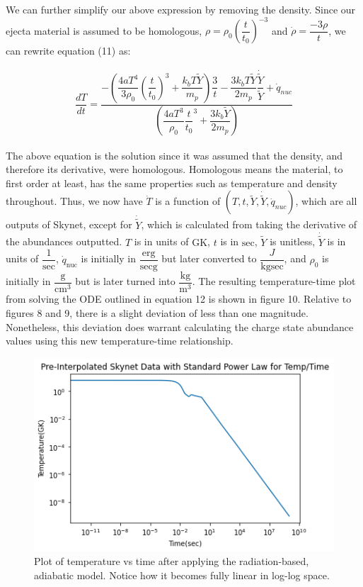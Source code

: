 \documentclass[11pt,a4paper]{article}
\begin{document}
We can further simplify our above expression by removing the density. Since our ejecta material is assumed to be homologous,  $\rho = \rho_0 \left(\dfrac{t}{t_0}\right)^{-3}$ and $\dot{\rho} = \dfrac{-3 \rho}{t}$, we can rewrite equation (11) as:

\begin{align}
	\dfrac{dT}{dt} =  \dfrac{ -\left( \dfrac{4aT^4}{3 \rho_0} \left (\dfrac{t}{t_0} \right)^3 + \dfrac{k_b T \tilde{Y}}{m_p} \right) \dfrac{3}{t} - \dfrac{3 k_b T \tilde{Y}}{2 m_p} \dfrac{\dot{\tilde{Y}}}{\tilde{Y}} + \dot{q}_{nuc} } {  \left( \dfrac{4 a T^3}{\rho_0} \dfrac{t}{t_0}^3 + \dfrac{3 k_b \tilde{Y}}{2 m_p}\right) }
\end{align}

The above equation is the solution since it was assumed that the density, and therefore its derivative, were homologous. Homologous means the material, to first order at least, has the same properties such as temperature and density throughout.  Thus, we now have $\dot{T}$ is a function of $(T,t,\tilde{Y}, \dot{\tilde{Y}},\dot{q}_{nuc})$, which are all outputs of Skynet, except for $\dot{\tilde{Y}}$, which is calculated from taking the derivative of the abundances outputted. $T$ is in units of $\mathrm{GK}$, $t$ is in $\mathrm{sec}$, $\tilde{Y}$ is unitless,                $\dot{\tilde{Y}}$ is in units of $\dfrac{1}{\mathrm{sec}}$, $\dot{q}_{\mathrm{nuc}}$ is initially in $\dfrac{\mathrm{erg}}{\mathrm{sec g}}$ but later converted to $\dfrac{J}{\mathrm{kg sec}}$, and $\rho_0$ is initially in $\dfrac{\mathrm{g}}{{\mathrm{cm}}^3}$ but is later turned into $\dfrac{\mathrm{kg}}{\mathrm{m}^3}$. The resulting temperature-time plot from solving the ODE outlined in equation 12 is shown in figure 10. Relative to figures 8 and 9, there is a slight deviation of less than one magnitude. Nonetheless, this deviation does warrant calculating the charge state abundance values using this new temperature-time relationship. \\


\begin{figure}[h!]
  \includegraphics[scale = .6]{linear_temp.png}
  \centering
  \caption{Plot of temperature vs time after applying the radiation-based, adiabatic model. Notice how it becomes fully linear in log-log space.}
\end{figure} 
\end{document}
